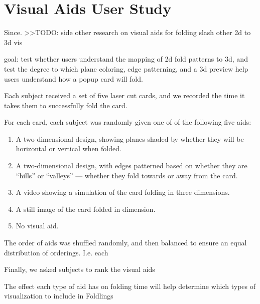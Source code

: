 \section{Visual Aids User Study}\label{visual-aids-user-study}

Since. \textgreater{}\textgreater{}TODO: side other research on visual
aids for folding slash other 2d to 3d vis

goal: test whether users understand the mapping of 2d fold patterns to
3d, and test the degree to which plane coloring, edge patterning, and a
3d preview help users understand how a popup card will fold.

Each subject received a set of five laser cut cards, and we recorded the
time it takes them to successfully fold the card.

For each card, each subject was randomly given one of of the following
five aids:

\begin{enumerate}
\def\labelenumi{\arabic{enumi})}
\itemsep1pt\parskip0pt
\item
  A two-dimensional design, showing planes shaded by whether they will
  be horizontal or vertical when folded.
\item
  A two-dimensional design, with edges patterned based on whether they
  are ``hills'' or ``valleys'' --- whether they fold towards or away
  from the card.
\item
  A video showing a simulation of the card folding in three dimensions.
\item
  A still image of the card folded in dimension.
\item
  No visual aid.
\end{enumerate}

The order of aids was shuffled randomly, and then balanced to ensure an
equal distribution of orderings. I.e. each

Finally, we asked subjects to rank the visual aids

The effect each type of aid has on folding time will help determine
which types of visualization to include in Foldlings
